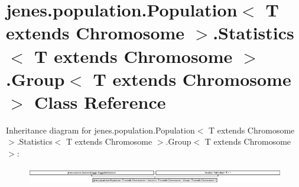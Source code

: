 \hypertarget{classjenes_1_1population_1_1_population_3_01_t_01extends_01_chromosome_01_4_1_1_statistics_3_01_f7597188e8ce49bb3794d06ba6cb2ae1}{\section{jenes.\-population.\-Population$<$ T extends Chromosome $>$.Statistics$<$ T extends Chromosome $>$.Group$<$ T extends Chromosome $>$ Class Reference}
\label{classjenes_1_1population_1_1_population_3_01_t_01extends_01_chromosome_01_4_1_1_statistics_3_01_f7597188e8ce49bb3794d06ba6cb2ae1}
}
Inheritance diagram for jenes.\-population.\-Population$<$ T extends Chromosome $>$.Statistics$<$ T extends Chromosome $>$.Group$<$ T extends Chromosome $>$\-:\begin{figure}[H]
\begin{center}
\leavevmode
\includegraphics[height=0.758808cm]{classjenes_1_1population_1_1_population_3_01_t_01extends_01_chromosome_01_4_1_1_statistics_3_01_f7597188e8ce49bb3794d06ba6cb2ae1}
\end{center}
\end{figure}
